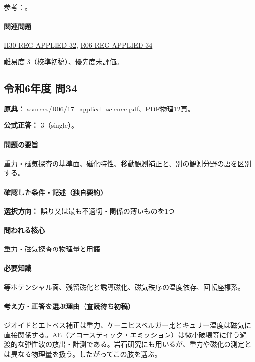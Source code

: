\par 参考：\cite{gsi_gravity_definitions,kanaya_okuma2011}。

\paragraph{関連問題} \hyperref[q:h30-reg-applied-32]{H30-REG-APPLIED-32}, \hyperref[q:r06-reg-applied-34]{R06-REG-APPLIED-34}

\par 難易度 3（校準初稿）、優先度未評価。

\subsection{令和6年度 問34}
\label{q:r06-reg-applied-34}

\noindent\textbf{原典：} sources/R06/17\_applied\_science.pdf、PDF物理12頁。

\textbf{公式正答：} 3（single）。

\paragraph{問題の要旨} 重力・磁気探査の基準面、磁化特性、移動観測補正と、別の観測分野の語を区別する。

\paragraph{確認した条件・記述（独自要約）}\mbox{}\par

\noindent\textbf{選択方向：} 誤り又は最も不適切・関係の薄いものを1つ\par

\paragraph{問われる核心} 重力・磁気探査の物理量と用語

\paragraph{必要知識} 等ポテンシャル面、残留磁化と誘導磁化、磁気秩序の温度依存、回転座標系。

\paragraph{考え方・正答を選ぶ理由（査読待ち初稿）} ジオイドとエトベス補正は重力、ケーニヒスベルガー比とキュリー温度は磁気に直接関係する。AE（アコースティック・エミッション）は微小破壊等に伴う過渡的な弾性波の放出・計測である。岩石研究にも用いるが、重力や磁化の測定とは異なる物理量を扱う。したがってこの肢を選ぶ。

